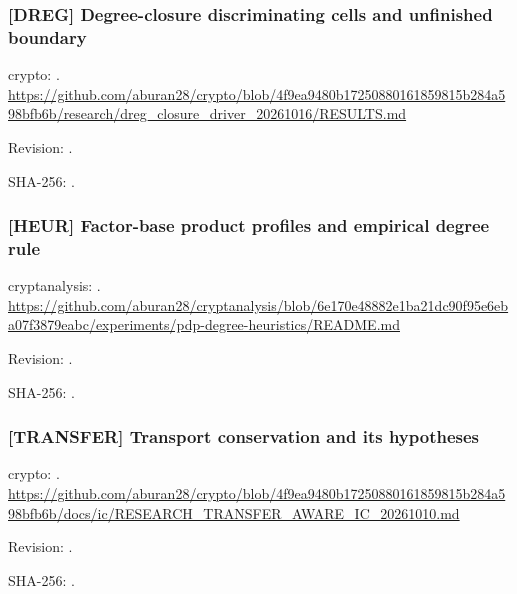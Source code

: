 \par\noindent\begin{minipage}{\linewidth}\small
\subsubsection*{[DREG] Degree-closure discriminating cells and unfinished boundary}\label{art:DREG}
crypto: .
\url{https://github.com/aburan28/crypto/blob/4f9ea9480b17250880161859815b284a598bfb6b/research/dreg_closure_driver_20261016/RESULTS.md}
\par Revision: .
\par SHA-256: .
\end{minipage}\par\medskip

\par\noindent\begin{minipage}{\linewidth}\small
\subsubsection*{[HEUR] Factor-base product profiles and empirical degree rule}\label{art:HEUR}
cryptanalysis: .
\url{https://github.com/aburan28/cryptanalysis/blob/6e170e48882e1ba21dc90f95e6eba07f3879eabc/experiments/pdp-degree-heuristics/README.md}
\par Revision: .
\par SHA-256: .
\end{minipage}\par\medskip

\par\noindent\begin{minipage}{\linewidth}\small
\subsubsection*{[TRANSFER] Transport conservation and its hypotheses}\label{art:TRANSFER}
crypto: .
\url{https://github.com/aburan28/crypto/blob/4f9ea9480b17250880161859815b284a598bfb6b/docs/ic/RESEARCH_TRANSFER_AWARE_IC_20261010.md}
\par Revision: .
\par SHA-256: .
\end{minipage}\par\medskip

